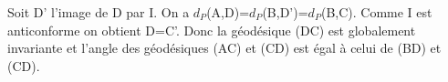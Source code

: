 \documentclass[a4paper, 12pt, twoside]{book}
\begin{document}
   Soit D' l'image de D par I. On a $d_{P}$(A,D)=$d_{P}$(B,D')=$d_{P}$(B,C). Comme I est anticonforme on obtient D=C'. Donc la géodésique (DC) est globalement invariante et l'angle des géodésiques (AC) et (CD) est égal à celui de (BD) et (CD).\\
   
  
 

    
    
    
    
   
  




  
     





\tableofcontents
\end{document}
